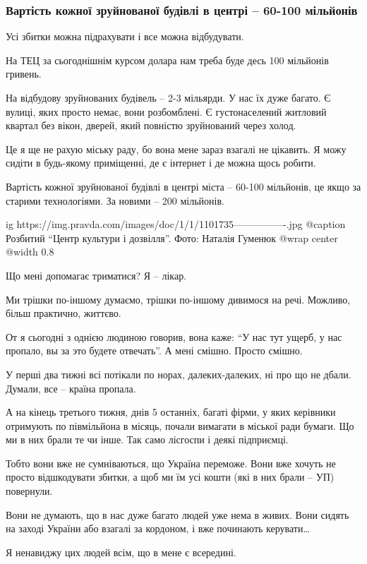  
 
 
 
 

\subsubsection{Вартість кожної зруйнованої будівлі в центрі – 60-100 мільйонів}

Усі збитки можна підрахувати і все можна відбудувати.

На ТЕЦ за сьогоднішнім курсом долара нам треба буде десь 100 мільйонів гривень. 

На відбудову зруйнованих будівель – 2-3 мільярди. У нас їх дуже багато. Є
вулиці, яких просто немає, вони розбомблені. Є густонаселений житловий квартал
без вікон, дверей, який повністю зруйнований через холод.

Це я ще не рахую міську раду, бо вона мене зараз взагалі не цікавить. Я можу
сидіти в будь-якому приміщенні, де є інтернет і де можна щось робити. 

Вартість кожної зруйнованої будівлі в центрі міста – 60-100 мільйонів, це якщо
за старими технологіями. За новими – 200 мільйонів.

\ifcmt
  ig https://img.pravda.com/images/doc/1/1/1101735----------------.jpg
	@caption Розбитий \enquote{Центр культури і дозвілля}. Фото: Наталія Гуменюк
  @wrap center
  @width 0.8
\fi

Що мені допомагає триматися? Я – лікар.

Ми трішки по-іншому думаємо, трішки по-іншому дивимося на речі. Можливо, більш
практично, життєво.

От я сьогодні з однією людиною говорив, вона каже: \enquote{У нас тут ущерб, у нас
пропало, вы за это будете отвечать}. А мені смішно. Просто смішно. 

У перші два тижні всі потікали по норах, далеких-далеких, ні про що не дбали.
Думали, все – країна пропала. 

А на кінець третього тижня, днів 5 останніх, багаті фірми, у яких керівники
отримують по півмільйона в місяць, почали вимагати в міської ради бумаги. Що ми
в них брали те чи інше. Так само лісгоспи і деякі підприємці. 

Тобто вони вже не сумніваються, що Україна переможе. Вони вже хочуть не просто
відшкодувати збитки, а щоб ми їм усі кошти (які в них брали – УП) повернули. 

Вони не думають, що в нас дуже багато людей уже нема в живих. Вони сидять на
заході України або взагалі за кордоном, і вже починають керувати… 

Я ненавиджу цих людей всім, що в мене є всередині.

